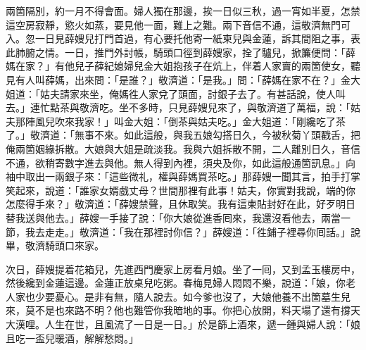 兩箇隔別，約一月不得會面。婦人獨在那邊，挨一日似三秋，過一宵如半夏，怎禁這空房寂靜，慾火如蒸，要見他一面，難上之難。兩下音信不通，這敬濟無門可入。忽一日見薛嫂兒打門首過，有心要托他寄一紙柬兒與金蓮，訴其間阻之事，表此肺腑之情。一日，推門外討帳，騎頭口徑到薛嫂家，拴了驢兒，掀簾便問：「薛媽在家？」有他兒子薛紀媳婦兒金大姐抱孩子在炕上，伴着人家賣的兩箇使女，聽見有人叫薛媽，出來問：「是誰？」敬濟道：「是我。」問：「薛媽在家不在？」金大姐道：「姑夫請家來坐，俺媽徃人家兌了頭面，討銀子去了。有甚話說，使人叫去。」連忙點茶與敬濟吃。坐不多時，只見薛嫂兒來了，與敬濟道了萬福，說：「姑夫那陣風兒吹來我家！」叫金大姐：「倒茶與姑夫吃。」金大姐道：「剛纔吃了茶了。」敬濟道：「無事不來。如此這般，與我五娘勾搭日久，今被秋菊丫頭戳舌，把俺兩箇姻緣拆散。大娘與大姐是疏淡我。我與六姐拆散不開，二人離別日久，音信不通，欲稍寄數字進去與他。無人得到內裡，須央及你，如此這般通箇訊息。」向袖中取出一兩銀子來：「這些微礼，權與薛媽買茶吃。」那薛嫂一聞其言，拍手打掌笑起來，說道：「誰家女婿戲丈母？世間那裡有此事！姑夫，你實對我說，端的你怎麼得手來？」敬濟道：「薛嫂禁聲，且休取笑。我有這柬貼封好在此，好歹明日替我送與他去。」薛嫂一手接了說：「你大娘從進香囘來，我還沒看他去，兩當一節，我去走走。」敬濟道：「我在那裡討你信？」薛嫂道：「徃鋪子裡尋你囘話。」說畢，敬濟騎頭口來家。

次日，薛嫂提着花箱兒，先進西門慶家上房看月娘。坐了一囘，又到孟玉樓房中，然後纔到金蓮這邊。金蓮正放桌兒吃粥。春梅見婦人悶悶不樂，說道：「娘，你老人家也少要憂心。是非有無，隨人說去。如今爹也沒了，大娘他養不出箇墓生兒來，莫不是也來路不明？他也難管你我暗地的事。你把心放開，料天塌了還有撐天大漢哩。人生在世，且風流了一日是一日。」{}於是篩上酒來，遞一鍾與婦人說：「娘且吃一盃兒暖酒，解解愁悶。」

